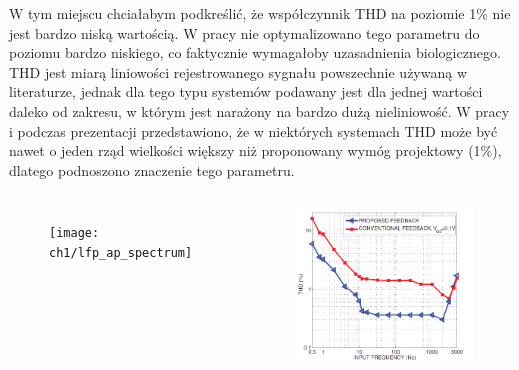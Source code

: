 \begin{frame}[t]
    \vspace{-1em}
    \begin{block}{\dk}
    \end{block}
\vspace{-1em}
    {\renewcommand\normalsize{\scriptsize}%
    \normalsize
        W tym miejscu chciałabym podkreślić, że współczynnik THD na poziomie 1\% nie jest bardzo niską wartością. 
        W pracy nie optymalizowano tego parametru do poziomu bardzo niskiego, co faktycznie wymagałoby uzasadnienia biologicznego. 
        THD jest miarą liniowości rejestrowanego sygnału powszechnie używaną w literaturze, jednak dla tego typu systemów podawany jest dla jednej wartości daleko od zakresu, w którym jest narażony na bardzo dużą nieliniowość. 
        W pracy i podczas prezentacji przedstawiono, że w niektórych systemach THD może być nawet o jeden rząd wielkości większy niż proponowany wymóg projektowy (1\%), dlatego podnoszono znaczenie tego parametru.
    }

    \begin{columns}
        \begin{figure}[H]
            \centering
            \texttt{[image: ch1/lfp\_ap\_spectrum]}  
            \end{figure}	
        \begin{figure}[H]
            \centering
            \includegraphics[scale=0.15]{Figures/genovTHD.png}
        \end{figure}
    \vspace{-1em}


\end{columns}
\end{frame}
